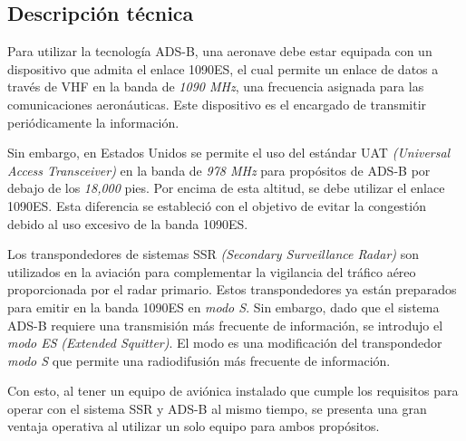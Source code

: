 \documentclass[a4paper, 11pt]{book}
\begin{document}
\subsection{Descripción técnica}
Para utilizar la tecnología \textsc{ADS-B}, una aeronave debe estar equipada con un dispositivo que admita el enlace \textsc{\gls{1090ES}}, el cual permite un enlace de datos a través de \textsc{VHF} en la banda de \emph{1090 MHz}, una frecuencia asignada para las comunicaciones aeronáuticas. Este dispositivo es el encargado de transmitir periódicamente la información.

Sin embargo, en Estados Unidos se permite el uso del estándar \textsc{\gls{UAT}} \emph{(Universal Access Transceiver)} en la banda de \emph{978 MHz} para propósitos de \textsc{ADS-B} por debajo de los \emph{18,000} pies. Por encima de esta altitud, se debe utilizar el enlace \textsc{1090ES}. Esta diferencia se estableció con el objetivo de evitar la congestión debido al uso excesivo de la banda \textsc{1090ES}.

Los transpondedores de sistemas \textsc{\gls{SSR}} \emph{(Secondary Surveillance Radar)} son utilizados en la aviación para complementar la vigilancia del tráfico aéreo proporcionada por el radar primario. Estos transpondedores ya están preparados para emitir en la banda \textsc{1090ES} en \emph{\gls{modo S}}. Sin embargo, dado que el sistema \textsc{ADS-B} requiere una transmisión más frecuente de información, se introdujo el \emph{modo ES} \emph{(Extended Squitter)}. El modo es una modificación del transpondedor \emph{\gls{modo S}} que permite una radiodifusión más frecuente de información.

Con esto, al tener un equipo de aviónica instalado que cumple los requisitos para operar con el sistema \textsc{\gls{SSR}} y \textsc{ADS-B} al mismo tiempo, se presenta una gran ventaja operativa al utilizar un solo equipo para ambos propósitos.
\end{document}
